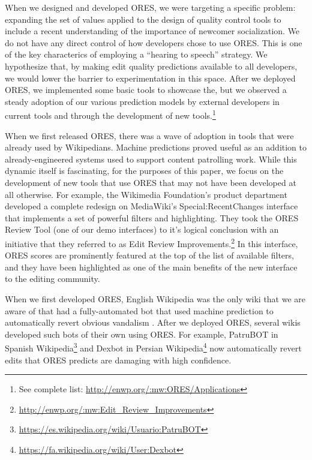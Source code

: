 When we designed and developed ORES, we were targeting a specific problem: expanding the set of values applied to the design of quality control tools to include a recent understanding of the importance of newcomer socialization.  We do not have any direct control of how developers chose to use ORES.  This is one of the key characterics of employing a ``hearing to speech'' strategy.  We hypothesize that, by making edit quality predictions available to all developers, we would lower the barrier to experimentation in this space.   After we deployed ORES, we implemented some basic tools to showcase the, but we observed a steady adoption of our various prediction models by external developers in current tools and through the development of new tools.\footnote{See complete list: \url{http://enwp.org/:mw:ORES/Applications}}

When we first released ORES, there was a wave of adoption in tools that were already used by Wikipedians.  Machine predictions proved useful as an addition to already-engineered systems used to support content patrolling work.  While this dynamic itself is fascinating, for the purposes of this paper, we focus on the development of new tools that use ORES that may not have been developed at all otherwise.  For example, the Wikimedia Foundation's product department developed a complete redesign on MediaWiki's Special:RecentChanges interface that implements a set of powerful filters and highlighting.  They took the ORES Review Tool (one of our demo interfaces) to it's logical conclusion with an initiative that they referred to as Edit Review Improvements.\footnote{\url{http://enwp.org/:mw:Edit_Review_Improvements}}  In this interface, ORES scores are prominently featured at the top of the list of available filters, and they have been highlighted as one of the main benefits of the new interface to the editing community.

When we first developed ORES, English Wikipedia was the only wiki that we are aware of that had a fully-automated bot that used machine prediction to automatically revert obvious vandalism \cite{carter2008cluebot}.  After we deployed ORES, several wikis developed such bots of their own using ORES.  For example, PatruBOT in Spanish Wikipedia\footnote{\url{https://es.wikipedia.org/wiki/Usuario:PatruBOT}} and Dexbot in Persian Wikipedia\footnote{\url{https://fa.wikipedia.org/wiki/User:Dexbot}} now automatically revert edits that ORES predicts are damaging with high confidence. 

